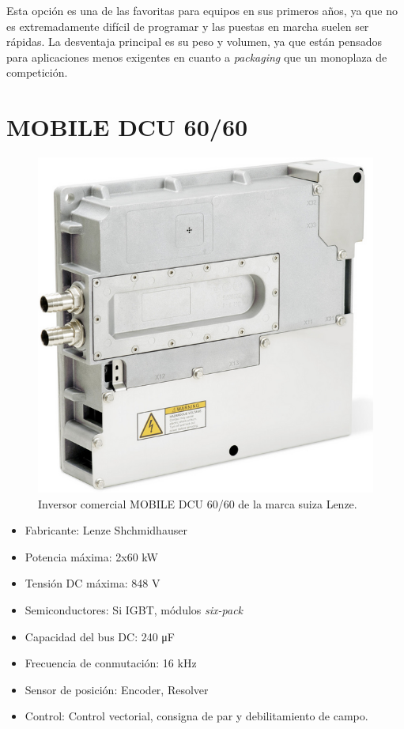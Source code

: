 Esta opción es una de las favoritas para equipos en sus primeros años, ya que no es extremadamente difícil de programar y las puestas en marcha suelen ser rápidas. La desventaja principal es su peso y volumen, ya que están pensados para aplicaciones menos exigentes en cuanto a \textit{packaging} que un monoplaza de competición.

\section{MOBILE DCU 60/60}
\begin{figure}[H]
	\centering
	\includegraphics[width=0.7\linewidth]{fig/lenze}
	\caption{Inversor comercial MOBILE DCU 60/60 de la marca suiza Lenze. \cite{bucherdrives_mobile_dcu}}
	\label{fig:lenze}
\end{figure}

\begin{itemize}
\item Fabricante: Lenze Shchmidhauser
\item Potencia máxima: 2x60 kW
\item Tensión DC máxima: 848 V
\item Semiconductores: Si IGBT, módulos \textit{six-pack}
\item Capacidad del bus DC: 240 \unit{\micro\farad}
\item Frecuencia de conmutación: 16 kHz
\item Sensor de posición: Encoder, Resolver
\item Control: Control vectorial, consigna de par y debilitamiento de campo.
\end{itemize}

